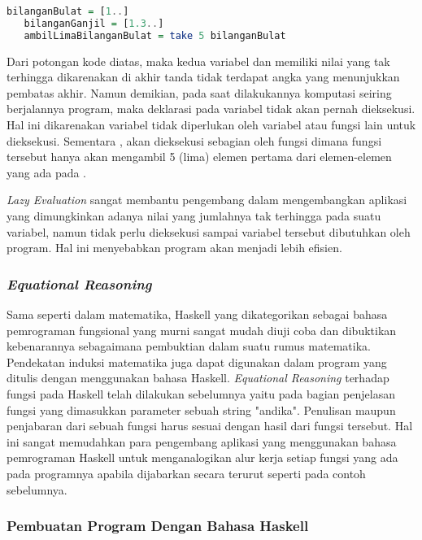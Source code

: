 \documentclass[pi.tex]{subfile}
\begin{document}
 \begin{lstlisting}[language=Haskell]
   bilanganBulat = [1..]
   bilanganGanjil = [1.3..]
   ambilLimaBilanganBulat = take 5 bilanganBulat
  \end{lstlisting}

 Dari potongan kode diatas, maka kedua variabel  dan  memiliki nilai yang tak terhingga dikarenakan di akhir tanda  tidak terdapat angka yang menunjukkan pembatas akhir. Namun demikian, pada saat dilakukannya komputasi seiring berjalannya program, maka deklarasi pada variabel  tidak akan pernah dieksekusi. Hal ini dikarenakan variabel  tidak diperlukan oleh variabel atau fungsi lain untuk dieksekusi. Sementara , akan dieksekusi sebagian oleh fungsi  dimana fungsi tersebut hanya akan mengambil 5 (lima) elemen pertama dari elemen-elemen yang ada pada .

 \emph{Lazy Evaluation} sangat membantu pengembang dalam mengembangkan aplikasi yang dimungkinkan adanya nilai yang jumlahnya tak terhingga pada suatu variabel, namun tidak perlu dieksekusi sampai variabel tersebut dibutuhkan oleh program. Hal ini menyebabkan program akan menjadi lebih efisien.

 
\subsubsection{\emph{Equational Reasoning}}
  
  Sama seperti dalam matematika, Haskell yang dikategorikan sebagai bahasa pemrograman fungsional yang murni sangat mudah diuji coba dan dibuktikan kebenarannya sebagaimana pembuktian dalam suatu rumus matematika. Pendekatan induksi matematika juga dapat digunakan dalam program yang ditulis dengan menggunakan bahasa Haskell. \emph{Equational Reasoning} terhadap fungsi pada Haskell telah dilakukan sebelumnya yaitu pada bagian penjelasan fungsi  yang dimasukkan parameter sebuah string "andika". Penulisan maupun penjabaran dari sebuah fungsi harus sesuai dengan hasil dari fungsi tersebut. Hal ini sangat memudahkan para pengembang aplikasi yang menggunakan bahasa pemrograman Haskell untuk menganalogikan alur kerja setiap fungsi yang ada pada programnya apabila dijabarkan secara terurut seperti pada contoh sebelumnya.

\subsubsection{Pembuatan Program Dengan Bahasa Haskell}
\end{document}
